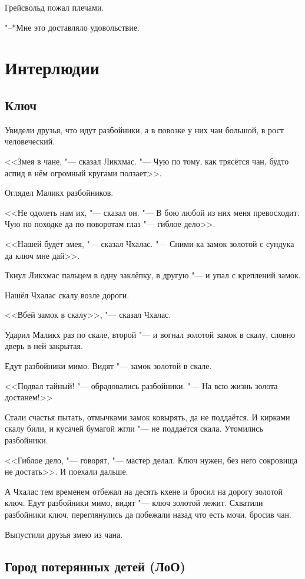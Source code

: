 \documentclass[a4paper,10pt,fleqn]{book}
\begin{document}
Грейсвольд пожал плечами.

"--*Мне это доставляло удовольствие.

\chapter{Интерлюдии}

\section{Ключ}

Увидели друзья, что идут разбойники, а в повозке у них чан большой, в рост человеческий.

<<Змея в чане, "--- сказал Ликхмас.
"--- Чую по тому, как трясётся чан, будто аспид в нём огромный кругами ползает>>.

Оглядел Маликх разбойников.

<<Не одолеть нам их, "--- сказал он.
"--- В бою любой из них меня превосходит.
Чую по походке да по поворотам глаз "--- гиблое дело>>.

<<Нашей будет змея, "--- сказал Чхалас.
"--- Сними-ка замок золотой с сундука да ключ мне дай>>.

Ткнул Ликхмас пальцем в одну заклёпку, в другую "--- и упал с креплений замок.

Нашёл Чхалас скалу возле дороги.

<<Вбей замок в скалу>>, "--- сказал Чхалас.

Ударил Маликх раз по скале, второй "--- и вогнал золотой замок в скалу, словно дверь в ней закрытая.

Едут разбойники мимо.
Видят "--- замок золотой в скале.

<<Подвал тайный! "--- обрадовались разбойники.
"--- На всю жизнь золота достанем!>>

Стали счастья пытать, отмычками замок ковырять, да не поддаётся.
И кирками скалу били, и кусачей бумагой жгли "--- не поддаётся скала.
Утомились разбойники.

<<Гиблое дело, "--- говорят, "--- мастер делал.
Ключ нужен, без него сокровища не достать>>.
И поехали дальше.

А Чхалас тем временем отбежал на десять кхене и бросил на дорогу золотой ключ.
Едут разбойники мимо, видят "--- ключ золотой лежит.
Схватили разбойники ключ, переглянулись да побежали назад что есть мочи, бросив чан.

Выпустили друзья змею из чана.

\section{Город потерянных детей (ЛоО)}
\end{document}
